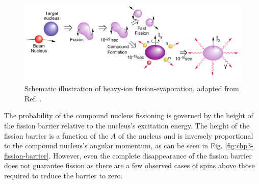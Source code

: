 \begin{figure}[h!]
	\centerline{\includegraphics[width=\textwidth]{./img/c3/fusion_evaporation.pdf}}
	\caption{Schematic illustration of heavy-ion fusion-evaporation, adapted from Ref. \cite{gsBooklet}.\label{fig:chp3-fus-evap-schem}}
\end{figure}

The probability of the compound nucleus fissioning is governed by the height of the fission barrier relative to the nucleus's excitation energy. The height of the fission barrier is a function of the $A$ of the nucleus and is inversely proportional to the compound nucleus's angular momentum, as can be seen in Fig. \ref{fig:chp3-fission-barrier}. However, even the complete disappearance of the fission barrier does not guarantee fission as there are a few observed cases of spins above those required to reduce the barrier to zero\cite{hyperdef,hyperdef2}.

